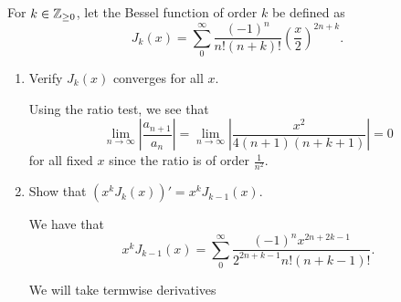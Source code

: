 \documentclass[../hw3]{subfiles}
\begin{document}
\begin{problem}
For $k\in \mathbb{Z}_{\ge 0}$, let the Bessel function of order $k$ be defined as  \[
	J_k(x)=\sum_{0}^{\infty} \frac{(-1)^n}{n!(n+k)!}{\left( \frac{x}{2} \right) }^{2n+k}
	.\]
\begin{enumerate}[label=\alph*)]
	\item Verify $J_k(x)$ converges for all  $x$.

	      Using the ratio test, we see that  \[
		      \lim_{n \to \infty} \left| \frac{a_{n+1}}{a_n} \right| =\lim_{n \to \infty}  \left| \frac{x^2}{4(n+1)(n+k+1)} \right| = 0
	      \] for all fixed $x$ since the ratio is of order  $\frac{1}{n^2}$.
	\item  Show that $(x^k J_k(x))' = x^k J_{k-1}(x)$.

	      We have that \[
		      x^k J_{k-1}(x) = \sum_{0}^{\infty} \frac{(-1)^n x^{2n+2k-1}}{2^{2n+k-1}n!(n+k-1)!}
		      .\]

	      We will take termwise derivatives
\end{enumerate}
\end{problem}
\end{document}
